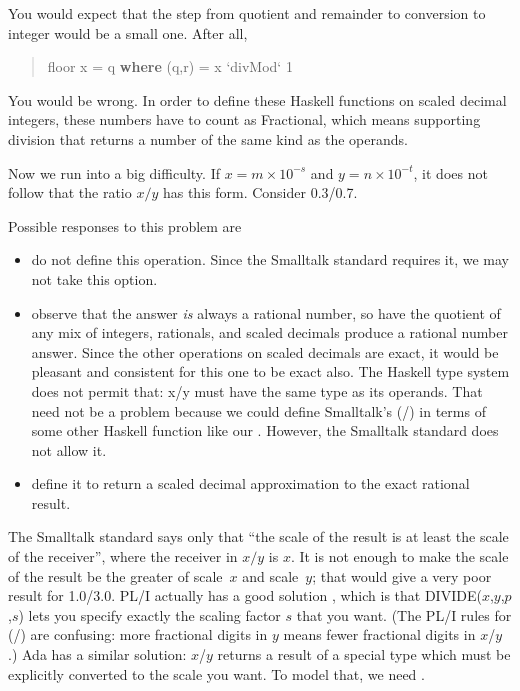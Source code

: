 \documentclass[prodmode,acmtoplas]{acmsmall}
\begin{document}
You would expect that the step from quotient and remainder
to conversion to integer would be a small one.  After all,
\begin{quote}
\begin{tabbing}
\sffamily floor x = q \textbf{where} (q,r) = x `divMod` 1
\end{tabbing}
\end{quote}
You would be wrong.  In order to define these Haskell functions
on scaled decimal integers, these numbers have to count as
Fractional, which means supporting division that returns a number
of the same kind as the operands.

Now we run into a big difficulty.  If $x=m\times 10^{-s}$ and
$y=n\times 10^{-t}$, it does not follow that the ratio $x/y$
has this form.  Consider 0.3/0.7.

Possible responses to this problem are
\begin{itemize}
\item do not define this operation.
Since the Smalltalk standard requires it, we may not take this option.
\item observe that the answer \textit{is} always a rational number,
so have the quotient of any mix of integers, rationals, and
scaled decimals produce a rational number answer.  Since the other
operations on scaled decimals are exact, it would be pleasant and
consistent for this one to be exact also.  The Haskell type system
does not permit that: x/y must have the same type as its operands.
That need not be a problem because we could define Smalltalk's
(/) in terms of some other Haskell function like our .
However, the Smalltalk standard does not allow it.
\item define it to return a scaled decimal approximation to the
exact rational result.
\end{itemize}

The Smalltalk standard says only that
``the scale of the result is at least the scale of the receiver'',
where the receiver in $x/y$ is $x$.
It is not enough to make the scale of the result be the greater
of scale~$x$ and scale~$y$; that would give a very poor result
for 1.0/3.0.
PL/I actually has a good solution \cite[page 429]{PLI}, which is
that DIVIDE($x$,$y$,$p$,$s$) lets you specify exactly the
scaling factor $s$ that you want.  (The PL/I rules for (/)
are confusing: more fractional digits in $y$ means fewer
fractional digits in $x$/$y$ \cite[page 64]{PLI}.)
Ada \cite[section 4.5.5]{ADA2,ADAW} has a
similar solution: $x$/$y$ returns a result of a special type
which must be explicitly converted to the scale you want.
To model that, we need .
\end{document}

